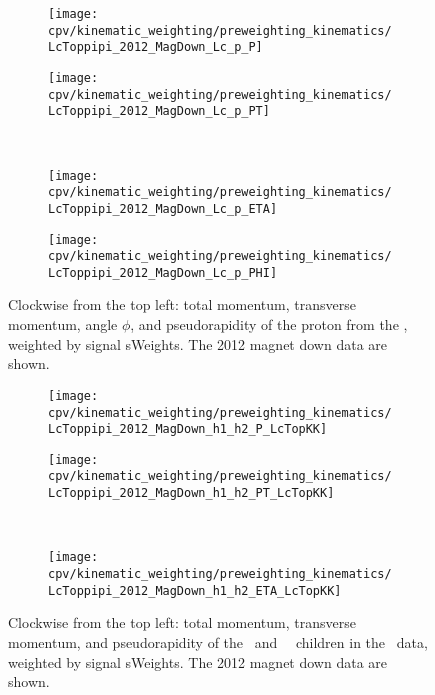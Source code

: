 \begin{figure}
  \begin{subfigure}[b]{0.4\textwidth}
    \texttt{[image: cpv/kinematic\_weighting/preweighting\_kinematics/LcToppipi\_2012\_MagDown\_Lc\_p\_P]}
    \label{fig:cpv:kinematic_weighting:pre:Lc_p:P}
  \end{subfigure}
  \begin{subfigure}[b]{0.4\textwidth}
    \texttt{[image: cpv/kinematic\_weighting/preweighting\_kinematics/LcToppipi\_2012\_MagDown\_Lc\_p\_PT]}
    \label{fig:cpv:kinematic_weighting:pre:Lc_p:PT}
  \end{subfigure}\\
  \begin{subfigure}[b]{0.4\textwidth}
    \texttt{[image: cpv/kinematic\_weighting/preweighting\_kinematics/LcToppipi\_2012\_MagDown\_Lc\_p\_ETA]}
    \label{fig:cpv:kinematic_weighting:pre:Lc_p:ETA}
  \end{subfigure}
  \begin{subfigure}[b]{0.4\textwidth}
    \texttt{[image: cpv/kinematic\_weighting/preweighting\_kinematics/LcToppipi\_2012\_MagDown\_Lc\_p\_PHI]}
    \label{fig:cpv:kinematic_weighting:pre:Lc_p:PHI}
  \end{subfigure}
  \caption{%
    Clockwise from the top left: total momentum, transverse momentum, angle 
    $\phi$, and pseudorapidity of the proton from the \PLambdac, weighted by 
    signal sWeights.
    The 2012 magnet down data are shown.
  }
  \label{fig:cpv:kinematic_weighting:pre:Lc_p}
\end{figure}

\begin{figure}
  \begin{subfigure}[b]{0.5\textwidth}
    \centering
    \texttt{[image: cpv/kinematic\_weighting/preweighting\_kinematics/LcToppipi\_2012\_MagDown\_h1\_h2\_P\_LcTopKK]}
    \label{fig:cpv:kinematic_weighting:pre:pKK_h1h2:P}
  \end{subfigure}
  \begin{subfigure}[b]{0.5\textwidth}
    \centering
    \texttt{[image: cpv/kinematic\_weighting/preweighting\_kinematics/LcToppipi\_2012\_MagDown\_h1\_h2\_PT\_LcTopKK]}
    \label{fig:cpv:kinematic_weighting:pre:pKK_h1h2:PT}
  \end{subfigure}\\
  \begin{subfigure}[b]{\textwidth}
    \centering
    \texttt{[image: cpv/kinematic\_weighting/preweighting\_kinematics/LcToppipi\_2012\_MagDown\_h1\_h2\_ETA\_LcTopKK]}
    \label{fig:cpv:kinematic_weighting:pre:pKK_h1h2:ETA}
  \end{subfigure}
  \caption{%
    Clockwise from the top left: total momentum, transverse momentum, and 
    pseudorapidity of the \PKminus\ and \PKplus\ \PLambdac\ children in the 
    \pKK\ data, weighted by signal sWeights.
    The 2012 magnet down data are shown.
  }
  \label{fig:cpv:kinematic_weighting:pre:pKK_h1h2}
\end{figure}

